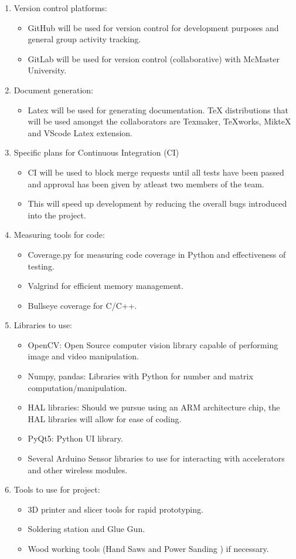 \documentclass[12pt]{article}
\begin{document}
\begin{enumerate}
\item Version control platforms:
\begin{itemize}
\item GitHub will be used for version control for development purposes and general group activity tracking.
\item GitLab will be used for version control (collaborative) with McMaster University.
\end{itemize}
\item Document generation:
\begin{itemize}
\item Latex will be used for generating documentation. TeX distributions that will be used amongst the collaborators are  Texmaker, TeXworks, MikteX and VScode Latex extension.
\end{itemize}
\item Specific plans for Continuous Integration (CI)
\begin{itemize}
\item CI will be used to block merge requests until all tests have been passed and approval has been given by atleast two members of the team. 
\item This will speed up development by reducing the overall bugs introduced into the project.
\end{itemize}
\item Measuring tools for code:
\begin{itemize}
\item Coverage.py for measuring code coverage in Python and effectiveness of testing.
\item Valgrind for efficient memory management.
\item Bullseye coverage for C/C++.
\end{itemize}
\item Libraries to use:
\begin{itemize}
\item OpenCV: Open Source computer vision library capable of performing image and video manipulation.
\item Numpy, pandas: Libraries with Python for number and matrix computation/manipulation.
\item HAL libraries: Should we pursue using an ARM architecture chip, the HAL libraries will allow for ease of coding.
\item PyQt5: Python UI library.
\item Several Arduino Sensor libraries to use for interacting with accelerators and other wireless modules.
\end{itemize}
\item Tools to use for project:
\begin{itemize}
\item 3D printer and slicer tools for rapid prototyping.
\item Soldering station and Glue Gun.
\item Wood working tools (Hand Saws and Power Sanding ) if necessary.
\end{itemize}
\end{enumerate}
\end{document}

